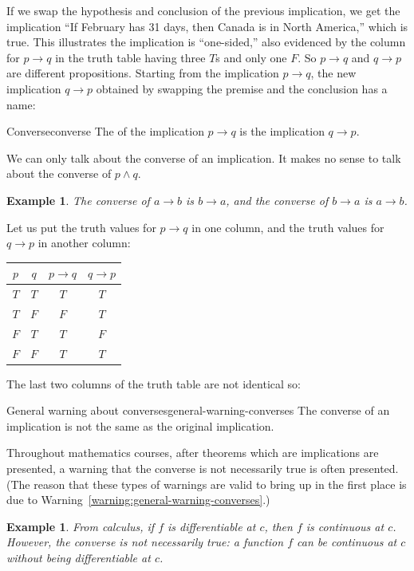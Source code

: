 \documentclass{book}
\newcounter{ekcounter}%
\theoremstyle{ekimcustom}
\newtheorem{example}[ekcounter]{Example}
\newcommand\defn[1]{{\color{blue}{\bf #1}}}
\begin{document}
If we swap the hypothesis and conclusion of the previous implication, we get the implication ``If February has 31 days, then Canada is in North America,'' which is true. This illustrates the implication is ``one-sided,'' also evidenced by the column for $p \rightarrow q$ in the truth table having three $T$s and only one $F$. So $p \rightarrow q$ and $q \rightarrow p$ are different propositions. Starting from the implication $p \rightarrow q$, the new implication $q \rightarrow p$ obtained by swapping the premise and the conclusion has a name:
\begin{bdefinition}{Converse}{converse}
The \defn{converse} of the implication $p \rightarrow q$ is the implication $q \rightarrow p$.
\end{bdefinition}
We can only talk about the converse of an implication. It makes no sense to talk about the converse of $p \wedge q$.
\begin{example}
The converse of $a \rightarrow b$ is $b \rightarrow a$, and the converse of $b \rightarrow a$ is $a \rightarrow b$.
\end{example}

Let us put the truth values for $p \rightarrow q$ in one column, and the truth values for $q \rightarrow p$ in another column:
\begin{center}
\begin{tabular}{c|c||c|c}
$p$ & $q$ & $p \rightarrow q$ & $q \rightarrow p$ \\\hline
$T$ & $T$ & $T$ & $T$\\
$T$ & $F$ & $F$ & $T$ \\
$F$ & $T$ & $T$ & $F$ \\
$F$ & $F$ & $T$ & $T$
\end{tabular}
\end{center}
The last two columns of the truth table are not identical so:
\begin{bwarning}{General warning about converses}{general-warning-converses}
The converse of an implication is not the same as the original implication.
\end{bwarning}
Throughout mathematics courses, after theorems which are implications are presented, a warning that the converse is not necessarily true is often presented. (The reason that these types of warnings are valid to bring up in the first place is due to Warning~\ref{warning:general-warning-converses}.)
\begin{example}
From calculus, if $f$ is differentiable at $c$, then $f$ is continuous at $c$. However, the converse is not necessarily true: a function $f$ can be continuous at $c$ without being differentiable at $c$.
\end{example}
\end{document}
